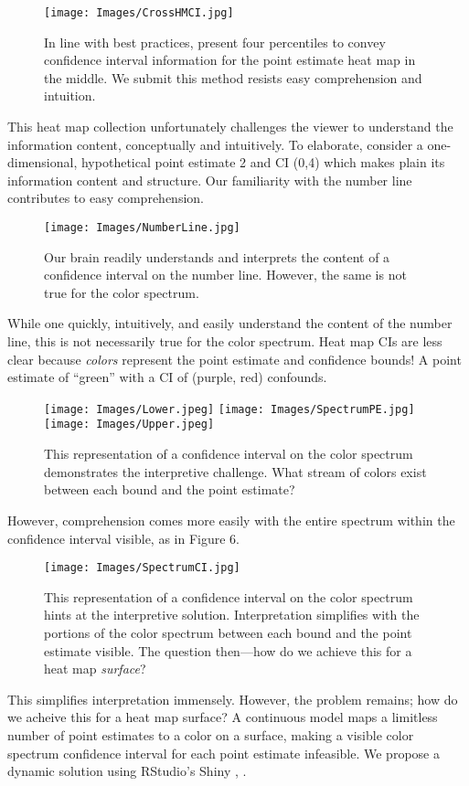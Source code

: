   \begin{figure}[H]
	\texttt{[image: Images/CrossHMCI.jpg]}
	\caption{In line with best practices, \cite{Cross2015} present four percentiles to convey confidence interval information for the point estimate heat map in the middle. We submit this method resists easy comprehension and intuition.}
	\end{figure}

This heat map collection unfortunately challenges the viewer to understand the information content, conceptually and intuitively. To elaborate, consider a one-dimensional, hypothetical point estimate 2 and CI (0,4) which makes plain its information content and structure. Our familiarity with the number line contributes to easy comprehension.
  \begin{figure}[H]
  \centering
	\texttt{[image: Images/NumberLine.jpg]}
	\caption{Our brain readily understands and interprets the content of a confidence interval on the number line. However, the same is not true for the color spectrum.}
	\end{figure}
While one quickly, intuitively, and easily understand the content of the number line, this is not necessarily true for the color spectrum. Heat map CIs are less clear because {\it colors} represent the point estimate and confidence bounds! A point estimate of ``green'' with a CI of (purple, red) confounds.
  \begin{figure}[H]
  \centering
	\texttt{[image: Images/Lower.jpeg]}
	\texttt{[image: Images/SpectrumPE.jpg]}
	\texttt{[image: Images/Upper.jpeg]}

	\caption{This representation of a confidence interval on the color spectrum demonstrates the interpretive challenge. What stream of colors exist between each bound and the point estimate?}
	\end{figure}

However, comprehension comes more easily with the entire spectrum within the confidence interval visible, as in Figure 6.
  \begin{figure}[H]
  \centering
	\texttt{[image: Images/SpectrumCI.jpg]}
	\caption{This representation of a confidence interval on the color spectrum hints at the interpretive solution. Interpretation simplifies with the portions of the color spectrum between each bound and the point estimate visible. The question then---how do we achieve this for a heat map {\it surface}?}
	\end{figure}
This simplifies interpretation immensely. However, the problem remains; how do we acheive this for a heat map surface? A continuous model maps a limitless number of point estimates to a color on a surface, making a visible color spectrum confidence interval for each point estimate infeasible. We propose a dynamic solution using RStudio's Shiny \citep{Shiny}, \citep{RStudio}.

